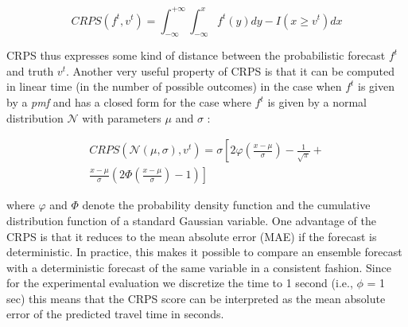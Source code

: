 \begin{equation}
CRPS(f^t, v^t) = \int_{-\infty}^{+\infty} \int_{-\infty}^{x} f^t(y) dy - I(x
\geq v^t) dx
\end{equation}

\vspace{0.1cm}

CRPS thus expresses some kind of distance between the probabilistic forecast $f^t$ and truth $v^t$. Another very useful property of CRPS is that it can be computed in linear time (in the number of possible outcomes) in the case when $f^t$ is given by a \textit{pmf} and has a closed form for the case where $f^t$ is given by a normal distribution $\mathcal{N}$ with parameters $\mu$ and $\sigma$ \cite{Gneiting04}:

\vspace{0.1cm}

\begin{multline}
CRPS(\mathcal{N}(\mu,\sigma), v^t) = \sigma \left[ 2\varphi\left(\frac{x -
\mu}{\sigma}\right) - \frac{1}{\sqrt{\pi}} + \right. \\ \left.\frac{x -
\mu}{\sigma}\left(2 \Phi\left(\frac{x - \mu}{\sigma}\right) - 1 \right) \right]
\end{multline}

\vspace{0.2cm}

where $\varphi$ and $\Phi$ denote the probability density function and the cumulative distribution function of a standard Gaussian variable. One advantage of the CRPS is that it reduces to the mean absolute error (MAE) if the forecast is deterministic. In practice, this makes it possible to compare an ensemble forecast with a deterministic forecast of the same variable in a consistent fashion. Since for the experimental evaluation we discretize the time to 1 second (i.e., $\phi$ = 1 sec) this means that the CRPS score can be interpreted as the mean absolute error of the predicted travel time in seconds.